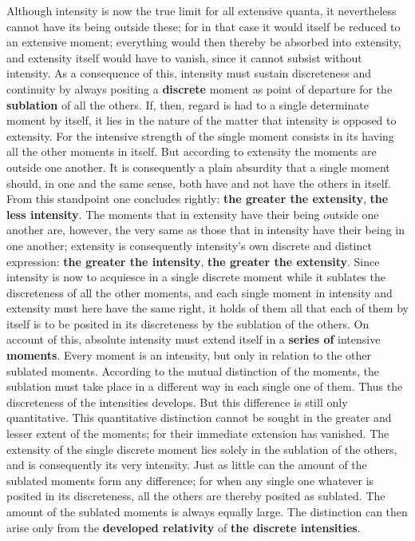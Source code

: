 \documentclass[12pt,a4paper,openany]{book}
\newcommand{\opage}[1]{\marginnote{\footnotesize\textit{[#1]}}}
\begin{document}
Although intensity is now the true limit for all extensive quanta, it nevertheless cannot have its being outside these; for in that case it would itself be reduced to an extensive moment; everything would then thereby be absorbed into extensity, and extensity itself would have to vanish, since it cannot subsist without intensity. As a consequence of this, intensity must sustain discreteness and continuity by always positing a \textbf{discrete} moment as point of departure for the \textbf{sublation} of all the others. If, then, regard is had to a single determinate moment by itself, it lies in the nature of the matter that intensity is opposed to extensity. For the intensive strength of the single moment consists in its having all the other moments in itself. But according to extensity the moments are outside one another. It is consequently a plain absurdity that a single moment should, in one and the same sense, both have and not have the others in itself. From this standpoint one concludes rightly: \textbf{the greater the extensity}, \textbf{the less intensity}. The moments that in extensity have their being outside one another are, however, the very same as those that in intensity have their being in one another;
\setcounter{footnote}{0}%
\opage{44}extensity is consequently intensity's own discrete and distinct expression: \textbf{the greater the intensity}, \textbf{the greater the extensity}. Since intensity is now to acquiesce in a single discrete moment while it sublates the discreteness of all the other moments, and each single moment in intensity and extensity must here have the same right, it holds of them all that each of them by itself is to be posited in its discreteness by the sublation of the others. On account of this, absolute intensity must extend itself in a \textbf{series of} intensive \textbf{moments}. Every moment is an intensity, but only in relation to the other sublated moments. According to the mutual distinction of the moments, the sublation must take place in a different way in each single one of them. Thus the discreteness of the intensities develops. But this difference is still only quantitative. This quantitative distinction cannot be sought in the greater and lesser extent of the moments; for their immediate extension has vanished. The extensity of the single discrete moment lies solely in the sublation of the others, and is consequently its very intensity. Just as little can the amount of the sublated moments form any difference; for when any single one whatever is posited in its discreteness, all the others are thereby posited as sublated. The amount of the sublated moments is always equally large. The distinction can then arise only from the \textbf{developed relativity} of \textbf{the discrete intensities}.
\end{document}
